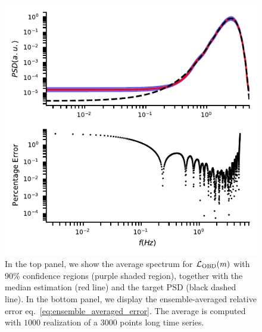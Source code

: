 \documentclass[twocolumn,showpacs,preprintnumbers,nofootinbib,prd,
superscriptaddress,10pt]{revtex4-1}
\begin{document}
\begin{figure}[t]
	\centering
	\includegraphics[width = \linewidth]{Images/optimisers_comparison/normal/OBD_spectrum_estim.pdf}
	\caption{In the top panel, we show the average spectrum for $\mathcal{L}_{\rm OBD}(m)$ with 90\% confidence regions (purple shaded region), together with the median estimation (red line) and the target PSD (black dashed line). In the bottom panel, we display the ensemble-averaged relative error eq.~\eqref{eq:ensemble_averaged_error}. The average is computed with $1000$ realization of a $3000$ points long time series.}
	\label{fig:OBDmean}
\end{figure}
\end{document}
